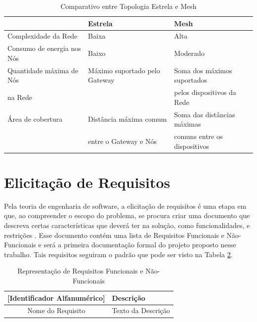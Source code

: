 \begin{table}[h!]
    \begin{center}
    \caption{Comparativo entre Topologia Estrela e Mesh}
    \label{table:topology}
    \begin{tabular}{|l|l|l|}
    \hline
     & Estrela & Mesh \\
    \hline
    Complexidade da Rede & Baixa & Alta \\
    \hline
    Consumo de energia nos Nós & Baixo & Moderado \\
    \hline
    Quantidade máxima de Nós & Máximo suportado pelo Gateway & Soma dos máximos suportados \\
    na Rede                  &                              & pelos dispositivos da Rede \\
    \hline
    Área de cobertura & Distância máxima comum & Soma das distâncias máximas \\
                    &  entre o Gateway e Nós & comuns entre os dispositivos \\
    \hline
    \end{tabular}
    \end{center}
\end{table}

\section{Elicitação de Requisitos}

Pela teoria de engenharia de software, a elicitação de requisitos é uma etapa
em que, ao compreender o escopo do problema, se procura criar uma documento
que descreva certas características que deverá ter na solução, como funcionalidades,
e restrições \cite{324822}. Esse documento contém uma lista de Requisitos
Funcionais e Não-Funcionais e será a primeira documentação formal do
projeto proposto nesse trabalho. Tais requisitos seguiram o padrão que pode
ser visto na Tabela \ref{table:req_model}.

\begin{table}[h]
    \begin{center}
    \caption{Representação de Requisitos Funcionais e Não-Funcionais}
    \label{table:req_model}
    \begin{tabular}{|c|l|}
    \hline
    \textbf{[Identificador Alfanumérico]} & \textbf{Descrição} \\
    \hline
    Nome do Requisito & Texto da Descrição \\
    \hline
    \end{tabular}
    \end{center}
\end{table}

